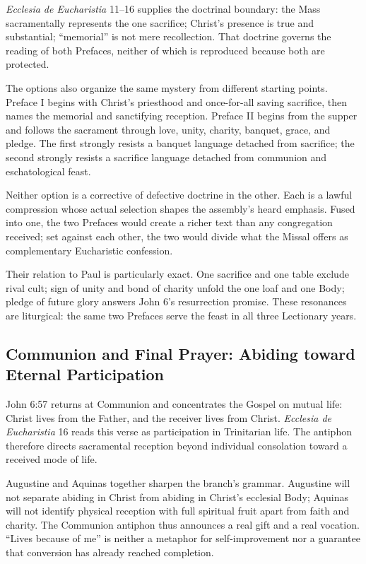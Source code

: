 \emph{Ecclesia de Eucharistia} 11--16 supplies the doctrinal boundary: the Mass sacramentally represents the one sacrifice; Christ's presence is true and substantial; “memorial” is not mere recollection. That doctrine governs the reading of both Prefaces, neither of which is reproduced because both are protected.

The options also organize the same mystery from different starting points. Preface I begins with Christ's priesthood and once-for-all saving sacrifice, then names the memorial and sanctifying reception. Preface II begins from the supper and follows the sacrament through love, unity, charity, banquet, grace, and pledge. The first strongly resists a banquet language detached from sacrifice; the second strongly resists a sacrifice language detached from communion and eschatological feast.

Neither option is a corrective of defective doctrine in the other. Each is a lawful compression whose actual selection shapes the assembly's heard emphasis. Fused into one, the two Prefaces would create a richer text than any congregation received; set against each other, the two would divide what the Missal offers as complementary Eucharistic confession.

Their relation to Paul is particularly exact. One sacrifice and one table exclude rival cult; sign of unity and bond of charity unfold the one loaf and one Body; pledge of future glory answers John 6's resurrection promise. These resonances are liturgical: the same two Prefaces serve the feast in all three Lectionary years.

\subsection*{Communion and Final Prayer: Abiding toward Eternal Participation\enspace{}}

John 6:57 returns at Communion and concentrates the Gospel on mutual life: Christ lives from the Father, and the receiver lives from Christ. \emph{Ecclesia de Eucharistia} 16 reads this verse as participation in Trinitarian life. The antiphon therefore directs sacramental reception beyond individual consolation toward a received mode of life.

Augustine and Aquinas together sharpen the branch's grammar. Augustine will not separate abiding in Christ from abiding in Christ's ecclesial Body; Aquinas will not identify physical reception with full spiritual fruit apart from faith and charity. The Communion antiphon thus announces a real gift and a real vocation. “Lives because of me” is neither a metaphor for self-improvement nor a guarantee that conversion has already reached completion.

